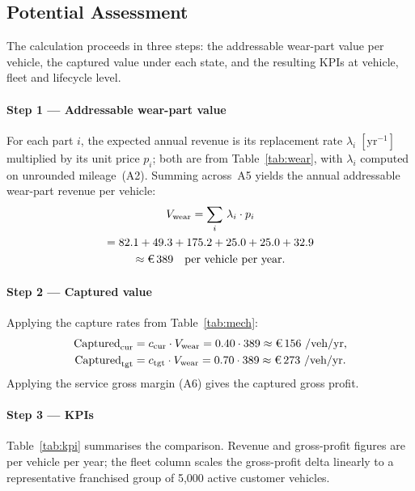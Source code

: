 \documentclass[conference,a4paper]{IEEEtran}
\newcommand{\eur}{\ifmmode\text{\texteuro}\else\texteuro\fi}
\newcommand{\cIst}{c_{\mathrm{cur}}}
\newcommand{\cSoll}{c_{\mathrm{tgt}}}
\begin{document}
\subsection{Potential Assessment}

The calculation proceeds in three steps: the addressable wear-part value per
vehicle, the captured value under each state, and the resulting KPIs at vehicle,
fleet and lifecycle level.
 
\paragraph*{Step 1 --- Addressable wear-part value}
For each part $i$, the expected annual revenue is its replacement rate
$\lambda_i\;[\mathrm{yr}^{-1}]$ multiplied by its unit price $p_i$; both are
from Table~\ref{tab:wear}, with $\lambda_i$ computed on unrounded mileage~(A2).
Summing across~A5 yields the annual addressable wear-part revenue per vehicle:
\begin{gather*}
V_{\mathrm{wear}} = \sum_{i}\,\lambda_i \cdot p_i \\
= 82.1 + 49.3 + 175.2 + 25.0 + 25.0 + 32.9 \\
\approx \eur\,389 \quad \text{per vehicle per year.}
\end{gather*}
 
\paragraph*{Step 2 --- Captured value}
Applying the capture rates from Table~\ref{tab:mech}:
\begin{align}
\text{Captured}_{\mathrm{cur}} &= \cIst  \cdot V_{\mathrm{wear}} = 0.40 \cdot 389 \approx \eur\,156~\text{/veh/yr,} \\
\text{Captured}_{\mathrm{tgt}} &= \cSoll \cdot V_{\mathrm{wear}} = 0.70 \cdot 389 \approx \eur\,273~\text{/veh/yr.}
\end{align}
Applying the service gross margin (A6) gives the captured gross profit.
 
\paragraph*{Step 3 --- KPIs}
Table~\ref{tab:kpi} summarises the comparison. Revenue and gross-profit figures
are per vehicle per year; the fleet column scales the gross-profit delta
linearly to a representative franchised group of 5{,}000 active customer
vehicles.
 
\end{document}
